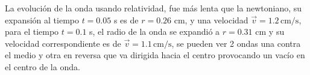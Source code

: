 \documentclass[12pt,a4paper]{book}
\begin{document}
La evolución de la onda usando relatividad, fue más lenta que la newtoniano, su expansión al tiempo $t = 0.05$ s es de $r = 0.26$ cm, y una velocidad $\vec{v} = 1.2 \, \mathrm{cm}/\mathrm{s}$, para el tiempo $t = 0.1$ s, el radio de la onda se expandió a $r = 0.31$ cm y su velocidad correspondiente es de $\vec{v} =1.1 \, \mathrm{cm}/\mathrm{s}$, se pueden ver 2 ondas una contra el medio y otra en reversa que va dirigida hacia el centro provocando un vacío en el centro de la onda.

\begin{figure}[H]
\centering
{}

\end{figure}
\end{document}
